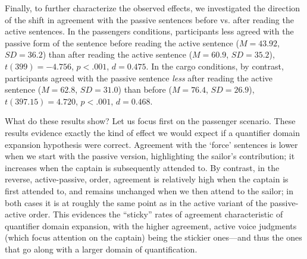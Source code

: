 \documentclass{salt}
\begin{document}
Finally, to further characterize the observed effects, we investigated the direction of the shift in agreement with the passive sentences before vs. after reading the active sentences. In the passengers conditions, participants less agreed with the passive form of the sentence before reading the active sentence ($M=43.92$, $SD=36.2$) than after reading the active sentence ($M=60.9$, $SD=35.2$), $t(399) = -4.756$, $p<.001$, $d=0.475$. In the cargo conditions, by contrast, participants agreed with the passive sentence \textit{less} after reading the active sentence ($M=62.8$, $SD=31.0$) than before ($M=76.4$, $SD=26.9$), $t(397.15) = 4.720$, $p<.001$, $d=0.468$.





What do these results show? Let us focus first on the passenger scenario. These results evidence exactly the kind of effect we would expect if a quantifier domain expansion hypothesis were correct. Agreement with the `force' sentences is lower when we start with the passive version, highlighting the sailor's contribution; it increases when the captain is subsequently attended to. By contrast, in the reverse, active-passive, order, agreement is relatively high when the captain is first attended to, and remains unchanged when we then attend to the sailor; in both cases it is at roughly the same point as in the active variant of the passive-active order. This evidences the ``sticky'' rates of agreement characteristic of quantifier domain expansion, with the higher agreement, active voice judgments (which focus attention on the captain) being the stickier ones---and thus the ones that go along with a larger domain of quantification. 
\end{document}
